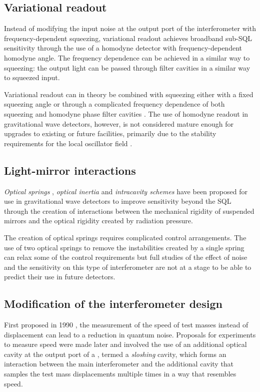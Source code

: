 \subsection{Variational readout}
Instead of modifying the input noise at the output port of the interferometer with frequency-dependent squeezing, variational readout achieves broadband sub-\gls{SQL} sensitivity through the use of a homodyne detector with frequency-dependent homodyne angle. The frequency dependence can be achieved in a similar way to squeezing: the output light can be passed through filter cavities in a similar way to squeezed input.

Variational readout can in theory be combined with squeezing either with a fixed squeezing angle \cite{Buonanno2004} or through a complicated frequency dependence of both squeezing and homodyne phase filter cavities \cite{Harms2003}. The use of homodyne readout in gravitational wave detectors, however, is not considered mature enough for upgrades to existing or future facilities, primarily due to the stability requirements for the local oscillator field \cite{Steinlechner2015}.

\subsection{Light-mirror interactions}
\emph{Optical springs} \cite{Braginsky1999, Buonanno2002, Corbitt2007, Rehbein2008, Gordon2015}, \emph{optical inertia} \cite{Khalili2011, Voronchev2012} and \emph{intracavity schemes} \cite{Braginsky1997, Khalili2002, Danilishin2006} have been proposed for use in gravitational wave detectors to improve sensitivity beyond the \gls{SQL} through the creation of interactions between the mechanical rigidity of suspended mirrors and the optical rigidity created by radiation pressure.

The creation of optical springs requires complicated control arrangements. The use of two optical springs to remove the instabilities created by a single spring can relax some of the control requirements but full studies of the effect of noise and the sensitivity on this type of interferometer are not at a stage to be able to predict their use in future detectors.

\subsection{Modification of the interferometer design}
First proposed in 1990 \cite{Braginsky1990}, the measurement of the speed of test masses instead of displacement can lead to a reduction in quantum noise. Proposals for experiments to measure speed were made later and involved the use of an additional optical cavity at the output port of a \MI{} \cite{Braginsky2000, Purdue2002}, termed a \emph{sloshing} cavity, which forms an interaction between the main interferometer and the additional cavity that samples the test mass displacements multiple times in a way that resembles speed.

